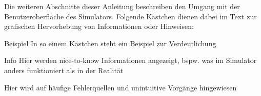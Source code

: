 Die weiteren Abschnitte dieser Anleitung beschreiben den Umgang mit der Benutzeroberfläche des Simulators. Folgende Kästchen dienen dabei im Text zur grafischen Hervorhebung von Informationen oder Hinweisen:
\begin{exampleblock}{Beispiel}
	In so einem Kästchen steht ein Beispiel zur Verdeutlichung
\end{exampleblock}

\begin{infoblock}{Info}
	Hier werden nice-to-know Informationen angezeigt, bspw. was im Simulator anders funktioniert als in der Realität
\end{infoblock}

\begin{warningblock}
	Hier wird auf häufige Fehlerquellen und unintuitive Vorgänge hingewiesen
\end{warningblock}

